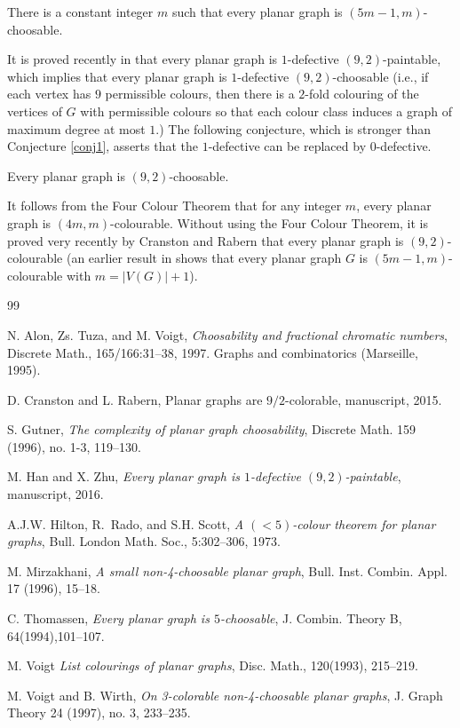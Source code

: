 \documentclass[12pt]{article}
\begin{document}
   

\begin{conjecture}
	\label{conj1}
	There is a constant integer $m$ such that every planar graph is $(5m-1,m)$-choosable.
\end{conjecture}

It is proved recently in \cite{HZ2016} that every planar graph is   $1$-defective
$(9,2)$-paintable, which implies that every planar graph is $1$-defective $(9,2)$-choosable (i.e., if each vertex has $9$ permissible colours, then there is a
$2$-fold colouring of the vertices of $G$ with permissible colours so that each colour class induces a graph of maximum degree at most $1$.) 
The following conjecture, which is stronger than Conjecture \ref{conj1}, asserts that the $1$-defective can be replaced by $0$-defective.

\begin{conjecture}
	\label{conj2}
	Every planar graph is $(9,2)$-choosable.
\end{conjecture}


 

It follows from the Four Colour Theorem  that for any integer $m$, every planar graph is $(4m,m)$-colourable. Without using the Four Colour Theorem, it is proved very recently by Cranston and Rabern  \cite{CR2016}  that every planar graph is $(9,2)$-colourable (an earlier result in \cite{HRS1973} shows that every planar graph $G$ is $(5m-1,m)$-colourable with $m = |V(G)|+1$).



\begin{thebibliography}{99}
	
	N. Alon, Zs. Tuza, and M. Voigt, {\em Choosability and fractional chromatic numbers}, Discrete Math.,	165/166:31--38, 1997. Graphs and combinatorics (Marseille, 1995).
	
	 D. Cranston and L. Rabern, {Planar graphs are $9/2$-colorable}, manuscript, 2015.
	
 S.	Gutner,  
{\em	The complexity of planar graph choosability},
	Discrete Math. 159 (1996), no. 1-3, 119--130. 
	
	 M. Han and X. Zhu, {\em Every planar graph is $1$-defective $(9,2)$-paintable}, manuscript, 2016.
	
	A.J.W. Hilton, R.~Rado, and  S.H. Scott, {\em   A $(<5)$-colour theorem for planar graphs},
  Bull. London Math. Soc., 5:302--306, 1973.
	
	
	 M. Mirzakhani,{\em  
		A small non-4-choosable planar graph},
	Bull. Inst. Combin. Appl. 17 (1996), 15--18. 

 
 C. Thomassen, {\em Every planar graph is $5$-choosable}, J. Combin. Theory B, 64(1994),101--107.   

 M. Voigt {\em List colourings of planar graphs}, Disc. Math., 120(1993), 215--219. 

 M.  Voigt and B. Wirth, {\em  On 3-colorable non-4-choosable planar graphs}, J. Graph Theory 24 (1997), no. 3, 233--235.

\end{thebibliography}
\end{document}
